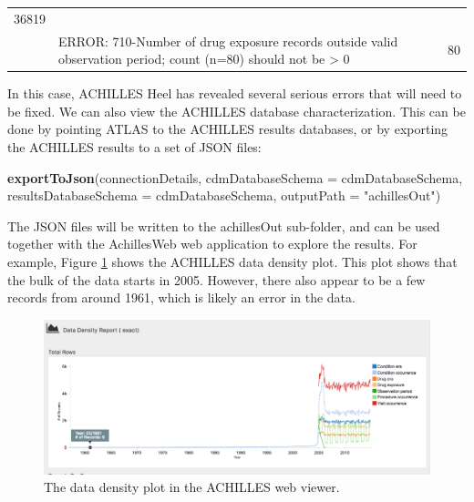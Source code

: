 \documentclass[11pt]{book}
\newenvironment{Shaded}{\begin{snugshade}}{\end{snugshade}}
\newcommand{\DataTypeTok}[1]{\textcolor[rgb]{0.13,0.29,0.53}{#1}}
\newcommand{\KeywordTok}[1]{\textcolor[rgb]{0.13,0.29,0.53}{\textbf{#1}}}
\newcommand{\NormalTok}[1]{#1}
\newcommand{\StringTok}[1]{\textcolor[rgb]{0.31,0.60,0.02}{#1}}
\theoremstyle{definition}
\theoremstyle{definition}
\theoremstyle{definition}
\theoremstyle{remark}
\begin{document}
\begin{longtable}[]{@{}clcl@{}}
\begin{minipage}[t]{0.07\columnwidth}
36819\strut
\end{minipage}\tabularnewline
\begin{minipage}[t]{0.07\columnwidth}\centering
710\strut
\end{minipage} & \begin{minipage}[t]{0.68\columnwidth}\raggedright
ERROR: 710-Number of drug exposure records outside valid observation period; count (n=80) should not be \textgreater{} 0\strut
\end{minipage} & \begin{minipage}[t]{0.07\columnwidth}\centering
1\strut
\end{minipage} & \begin{minipage}[t]{0.07\columnwidth}\raggedright
80\strut
\end{minipage}\tabularnewline
\bottomrule
\end{longtable}

In this case, ACHILLES Heel has revealed several serious errors that will need to be fixed. We can also view the ACHILLES database characterization. This can be done by pointing ATLAS to the ACHILLES results databases, or by exporting the ACHILLES results to a set of JSON files:

\begin{Shaded}
\begin{Highlighting}[]
\KeywordTok{exportToJson}\NormalTok{(connectionDetails,}
             \DataTypeTok{cdmDatabaseSchema =}\NormalTok{ cdmDatabaseSchema,}
             \DataTypeTok{resultsDatabaseSchema =}\NormalTok{ cdmDatabaseSchema,}
             \DataTypeTok{outputPath =} \StringTok{"achillesOut"}\NormalTok{)}
\end{Highlighting}
\end{Shaded}

The JSON files will be written to the achillesOut sub-folder, and can be used together with the AchillesWeb web application to explore the results. For example, Figure \ref{fig:achillesDataDensity} shows the ACHILLES data density plot. This plot shows that the bulk of the data starts in 2005. However, there also appear to be a few records from around 1961, which is likely an error in the data.

\begin{figure}

{\centering \includegraphics[width=1\linewidth]{images/DataQuality/achillesDataDensity} 

}

\caption{The data density plot in the ACHILLES web viewer.}\label{fig:achillesDataDensity}
\end{figure}
\end{document}
